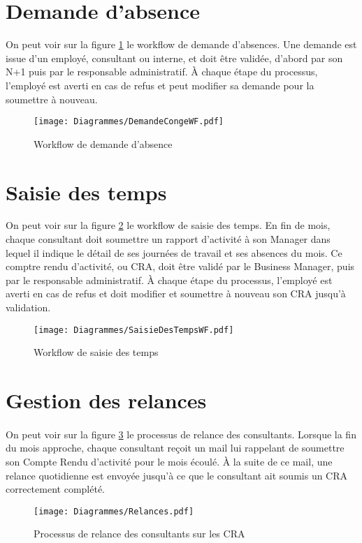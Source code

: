 \section{Demande d'absence}
On peut voir sur la figure \ref{conges} le workflow de demande d'absences. Une demande est issue d'un employé, consultant ou interne, et doit être validée, d'abord par son N+1 puis par le responsable administratif. À chaque étape du processus, l'employé est averti en cas de refus et peut modifier sa demande pour la soumettre à nouveau.
\begin{figure}
	\centering
	\texttt{[image: Diagrammes/DemandeCongeWF.pdf]}
	\caption{Workflow de demande d'absence}
	\label{conges}
\end{figure}

\section{Saisie des temps}

On peut voir sur la figure \ref{tps} le workflow de saisie des temps. En fin de mois, chaque consultant doit soumettre un rapport d'activité à son Manager dans lequel il indique le détail de ses journées de travail et ses absences du mois. Ce comptre rendu d'activité, ou CRA, doit être validé par le Business Manager, puis par le responsable administratif. À chaque étape du processus, l'employé est averti en cas de refus et doit modifier et soumettre à nouveau son CRA jusqu'à validation.
\begin{figure}
	\centering
	\texttt{[image: Diagrammes/SaisieDesTempsWF.pdf]}
	\caption{Workflow de saisie des temps}
	\label{tps}
\end{figure}


\section{Gestion des relances}
\paragraph{} On peut voir sur la figure \ref{relances} le processus de relance des consultants. Lorsque la fin du mois approche, chaque consultant reçoit un mail lui rappelant de soumettre son Compte Rendu d'activité pour le mois écoulé. À la suite de ce mail, une relance quotidienne est envoyée jusqu'à ce que le consultant ait soumis un CRA correctement complété.
\begin{figure}
\centering
	\texttt{[image: Diagrammes/Relances.pdf]}
	\caption{Processus de relance des consultants sur les CRA}
	\label{relances}
\end{figure}




